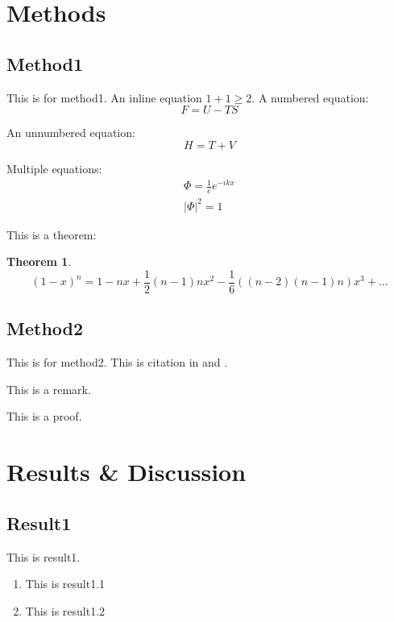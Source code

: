 \documentclass[
preprint, %
10pt,
oneside,
onecolumn, 1p,
authoryear, %
times,
]{elsarticle}
\newtheorem{thm}{Theorem}
\begin{document}
\section{Methods}
\subsection{Method1}
This is for method1. An inline equation $1+1\geq2$.
A numbered equation:
\begin{equation}
F=U-TS
\end{equation}

An unnumbered equation:
\[H=T+V\]

Multiple equations:
\begin{eqnarray}
\Phi=\frac{1}{c}e^{-ikx}\\
|\Phi|^2=1
\end{eqnarray}

This is a theorem:
\begin{thm}
\[(1-x)^n=1-nx+\frac{1}{2}(n-1)nx^2-\frac{1}{6}((n-2)(n-1)n)x^3+...\]
\end{thm}

\subsection{Method2}
This is for method2. This is citation in \citet{PhysRevLett.99.077601} and \citep[e.g.][p. 1]{PhysRevLett.99.077601}. 

\begin{rmk}
This is a remark.
\end{rmk}

\begin{pf}
This is a proof.
\end{pf}

\section{Results \& Discussion}
\subsection{Result1}
This is result1.
\begin{enumerate}[(Res. 1.)]
\item This is result1.1
\item This is result1.2
\end{enumerate}
\end{document}
